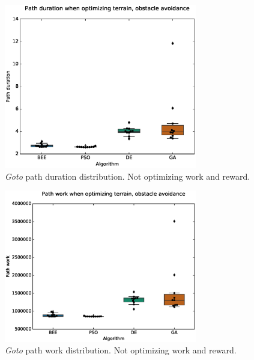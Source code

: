 \documentclass{tamuccthesis}
\begin{document}
\begin{figure}
    \captionsetup{justification=centering}
    \centering
    \includegraphics[width=0.75\textwidth,trim={0cm 0.75cm 0cm 0.75cm},clip]{EXP3_histo_duration_a.eps}
    \caption{\textit{Goto} path duration distribution. Not optimizing work and reward. }
    \label{fig:algcompare_a_duration}
\end{figure}

\begin{figure}
    \captionsetup{justification=centering}
    \centering
    \includegraphics[width=0.75\textwidth,trim={0cm 0.75cm 0cm 0.75cm},clip]{EXP3_histo_work_a.eps}
    \caption{\textit{Goto} path work distribution. Not optimizing work and reward. }
    \label{fig:algcompare_a_work}
\end{figure}
\end{document}
